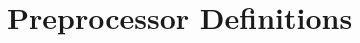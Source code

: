 \hypertarget{group___d_e_f_i_n_e_s}{}\section{Preprocessor Definitions}
\label{group___d_e_f_i_n_e_s}
